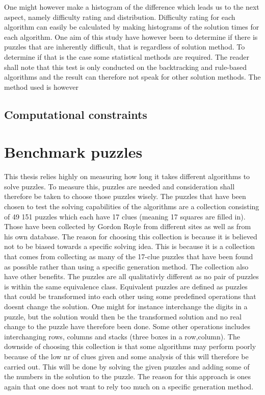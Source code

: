 \documentclass[a4paper,11pt]{kth-mag}
\begin{document}
One might however make a histogram of the difference which leads us to the next aspect, namely difficulty rating and distribution. 
Difficulty rating for each algorithm can easily be calculated by making histograms of the solution times for each algorithm. 
One aim of this study have however been to determine if there is puzzles that are inherently difficult, that is regardless of solution method.
To determine if that is the case some statistical methods are required. The reader shall note that this test is only conducted on the backtracking and rule-based algorithms and the result can therefore not speak for other solution methods.
The method used is however  

\subsection{Computational constraints}


\section{Benchmark puzzles}
This thesis relies highly on measuring how long it takes different algorithms to solve puzzles. 
To measure this, puzzles are needed and consideration shall therefore be taken to choose those puzzles wisely.
The puzzles that have been chosen to test the solving capabilities of the algorithms are a collection consisting of 49 151 puzzles which each have 17 clues (meaning 17 squares are filled in). \cite{database} Those have been collected by Gordon Royle from different sites as well as from his own database.
The reason for choosing this collection is because it is believed not to be biased towards a specific solving idea.
This is because it is a collection that comes from collecting as many of the 17-clue puzzles that have been found as possible rather than using a specific generation method.
The collection also have other benefits.
The puzzles are all qualitativly different as no pair of puzzles is within the same equivalence class.
Equivalent puzzles are defined as puzzles that could be transformed into each other using some predefined operations that doesnt change the solution.
One might for instance interchange the digits in a puzzle, but the solution would then be the transformed solution and no real change to the puzzle have therefore been done.
Some other operations includes interchanging rows, columns and stacks (three boxes in a row,column).
The downside of choosing this collection is that some algorithms may perform poorly because of the low nr of clues given and some analysis of this will therefore be carried out.
This will be done by solving the given puzzles and adding some of the numbers in the solution to the puzzle.
The reason for this approach is ones again that one does not want to rely too much on a specific generation method.
\end{document}
